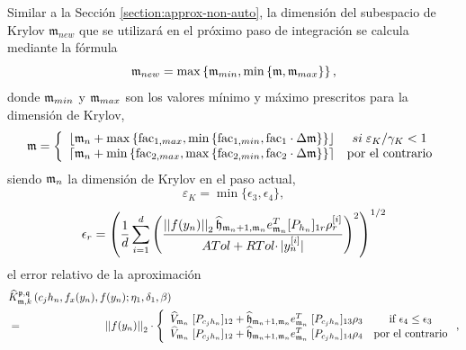 Similar a la Sección \ref{section:approx-non-auto}, la dimensión del subespacio de Krylov $\mathfrak{m}_{new}$ que se utilizará en el próximo paso de integración se calcula mediante la fórmula
\begin{equation}\label{calcmnew-fj}
	\mathfrak{m}_{new}= \max\left\{ \mathfrak{m}_{min}, \min\left\{ \mathfrak{m} , \mathfrak{m}_{max}  \right\} \right\},
	\end{equation}
donde $\mathfrak{m}_{min}$ y $\mathfrak{m}_{max}$ son los valores mínimo y máximo prescritos para la dimensión de Krylov,
\begin{equation}
	\mathfrak{m} = \left\{
\begin{array}{cc}
\left\lfloor \mathfrak{m}_{n} + \max\left\{ \mathrm{fac}_{1,max} , \min\left\{ \mathrm{fac}_{1,min},
		\mathrm{fac}_1\cdot\Delta\mathfrak{m} \right\}  \right\} \right\rfloor & si \;  \varepsilon_{K}/\gamma_{K}< 1\\
\left\lceil \mathfrak{m}_{n} + \min\left\{ \mathrm{fac}_{2,max} , \max\left\{ \mathrm{fac}_{2,min},
		\mathrm{fac}_2\cdot\Delta\mathfrak{m} \right\}  \right\} \right\rceil  & \text{por el contrario}
\end{array}
\right. \label{m_unica}
\end{equation}
siendo $\mathfrak{m}_{n}$ la dimensión de Krylov  en el paso actual,
\begin{equation} \label{errrel-fj}
	\varepsilon_{K} = \min \{\epsilon _{3},\epsilon _{4}\},
	\end{equation}
	\begin{equation*}
	\epsilon_{r} = \left(\frac{1}{d}\sum\limits_{i=1}^{d} \left(\frac{\left\lvert \left\lvert f(y_n) \right\rvert \right\rvert_2
		\widehat{\mathfrak{h}}_{\mathfrak{m}_n+1,\mathfrak{m}_n} e_{\mathfrak{m}_n}^T
		[P_{h_n}]_{1r} \rho_r^{[i]}}{ATol+ RTol\cdotp
		\lvert y_{n}^{[i]}\rvert}\right)^{2}\right)^{1/2}
\end{equation*}
el error relativo de la aproximación
\begin{eqnarray}
	&\widehat{K}_{\mathfrak{m},k}^{\mathfrak{p},\mathfrak{q}}\left(
	c_{j}h_{n},f_{x}(y_{n}),f(y_{n});\eta _{1},\delta _{1},\beta \right) &
	\label{eq:adapt_gen_kp_aprox} \\
	&=& \hspace{-2.5cm}\nnorm{\nnorm{f(y_n)}}_2 \cdot\left\{
	\begin{array}{cc}
	\widehat{V}_{\mathfrak{m}_n}\;[P_{c_{j}h_n}]_{12}+
	\widehat{\mathfrak{h}}_{\mathfrak{m}_n+1,\mathfrak{m}_n}e_{\mathfrak{m}_n }^{T}\;[P_{c_{j}h_n}]_{13}\rho _{3} & \text{if }\epsilon _{4}\leq \epsilon _{3}
	\\
	\widehat{V}_{\mathfrak{m}_n}\;[P_{c_{j}h_n}]_{12}+
	\widehat{\mathfrak{h}}_{\mathfrak{m}_n+1,\mathfrak{m}_n}e_{\mathfrak{m}_n }^{T}\;[P_{c_{j}h_n}]_{14}\rho _{4} & \text{por el contrario}%
	\end{array}
	\right. ,  \notag
\end{eqnarray}
